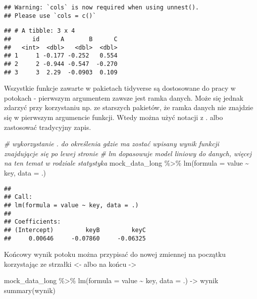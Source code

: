 \documentclass[
]{book}
\newenvironment{Shaded}{\begin{snugshade}}{\end{snugshade}}
\newcommand{\AttributeTok}[1]{\textcolor[rgb]{0.77,0.63,0.00}{#1}}
\newcommand{\CommentTok}[1]{\textcolor[rgb]{0.56,0.35,0.01}{\textit{#1}}}
\newcommand{\FunctionTok}[1]{\textcolor[rgb]{0.00,0.00,0.00}{#1}}
\newcommand{\NormalTok}[1]{#1}
\newcommand{\OtherTok}[1]{\textcolor[rgb]{0.56,0.35,0.01}{#1}}
\newcommand{\SpecialCharTok}[1]{\textcolor[rgb]{0.00,0.00,0.00}{#1}}
\begin{document}
\begin{verbatim}
## Warning: `cols` is now required when using unnest().
## Please use `cols = c()`
\end{verbatim}

\begin{verbatim}
## # A tibble: 3 x 4
##      id      A       B      C
##   <int>  <dbl>   <dbl>  <dbl>
## 1     1 -0.177 -0.252   0.554
## 2     2 -0.944 -0.547  -0.270
## 3     3  2.29  -0.0903  0.109
\end{verbatim}

Wszystkie funkcje zawarte w pakietach tidyverse są dostosowane do pracy w potokach - pierwszym argumentem zawsze jest ramka danych. Może się jednak zdarzyć przy korzystaniu np. ze starszych pakietów, że ramka danych nie znajdzie się w pierwszym argumencie funkcji. Wtedy można użyć notacji z . albo zastosować tradycyjny zapis.

\begin{Shaded}
\begin{Highlighting}[]
\CommentTok{\# wykorzystanie . do określenia gdzie ma zostać wpisany wynik funkcji znajdującje się po lewej stronie}
\CommentTok{\# lm dopasowuje model liniowy do danych, więcej na ten temat w rodziale statystyka}
\NormalTok{mock\_data\_long }\SpecialCharTok{\%\textgreater{}\%} \FunctionTok{lm}\NormalTok{(}\AttributeTok{formula =}\NormalTok{ value }\SpecialCharTok{\textasciitilde{}}\NormalTok{ key, }\AttributeTok{data =}\NormalTok{ .)}
\end{Highlighting}
\end{Shaded}

\begin{verbatim}
## 
## Call:
## lm(formula = value ~ key, data = .)
## 
## Coefficients:
## (Intercept)         keyB         keyC  
##     0.00646     -0.07860     -0.06325
\end{verbatim}

Końcowy wynik potoku można przypisać do nowej zmiennej na początku korzystając ze strzałki \textless- albo na końcu -\textgreater{}

\begin{Shaded}
\begin{Highlighting}[]
\NormalTok{mock\_data\_long }\SpecialCharTok{\%\textgreater{}\%} \FunctionTok{lm}\NormalTok{(}\AttributeTok{formula =}\NormalTok{ value }\SpecialCharTok{\textasciitilde{}}\NormalTok{ key, }\AttributeTok{data =}\NormalTok{ .) }\OtherTok{{-}\textgreater{}}\NormalTok{ wynik}
\FunctionTok{summary}\NormalTok{(wynik)}
\end{Highlighting}
\end{Shaded}
\end{document}
